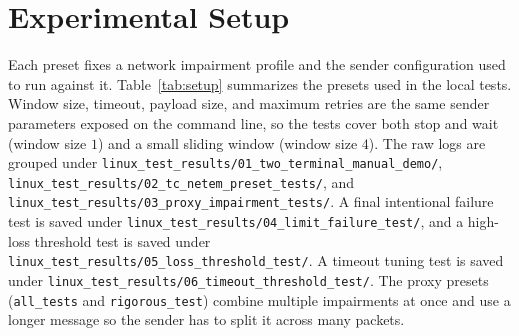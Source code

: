 \documentclass[conference]{IEEEtran}
\begin{document}
\section{Experimental Setup}
Each preset fixes a network impairment profile and the sender configuration
used to run against it. Table~\ref{tab:setup} summarizes the presets used in
the local tests. Window size, timeout, payload size, and maximum retries are
the same sender parameters exposed on the command line, so the tests cover
both stop and wait (window size $1$) and a small sliding window (window size
$4$). The raw logs are grouped under
\texttt{linux\_test\_results/01\_two\_terminal\_manual\_demo/},
\texttt{linux\_test\_results/02\_tc\_netem\_preset\_tests/}, and
\texttt{linux\_test\_results/03\_proxy\_impairment\_tests/}. A final
intentional failure test is saved under
\texttt{linux\_test\_results/04\_limit\_failure\_test/}, and a high-loss
threshold test is saved under
\texttt{linux\_test\_results/05\_loss\_threshold\_test/}. A timeout tuning
test is saved under
\texttt{linux\_test\_results/06\_timeout\_threshold\_test/}. The proxy presets
(\texttt{all\_tests} and \texttt{rigorous\_test}) combine multiple impairments
at once and use a longer message so the sender has to split it across many
packets.

\begin{table}[t]
\caption{Test presets. ``--'' = default sender retry budget.}
\label{tab:setup}
\centering
\scriptsize
\setlength{\tabcolsep}{3pt}
\end{table}
\end{document}
